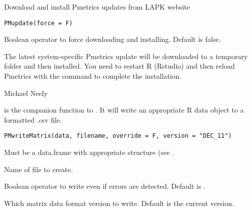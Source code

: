 \documentclass[a4paper]{book}
\begin{document}
%
\begin{Description}\relax
Download and install Pmetrics updates from LAPK website
\end{Description}
%
\begin{Usage}
\begin{verbatim}
PMupdate(force = F)
\end{verbatim}
\end{Usage}
%
\begin{Arguments}
\begin{ldescription}
\item[\code{force}] Boolean operator to force downloading and installing.  Default is false.
\end{ldescription}
\end{Arguments}
%
\begin{Value}
The latest system-specific Pmetrics update will be downloaded to a temporary
folder and then installed.  You need to restart R (Rstudio) and then reload Pmetrics with
the  command to complete the installation.
\end{Value}
%
\begin{Author}\relax
Michael Neely
\end{Author}
%
\begin{Description}\relax
{} is the companion function to .
It will write an appropriate R data object to a formatted .csv file.
\end{Description}
%
\begin{Usage}
\begin{verbatim}
PMwriteMatrix(data, filename, override = F, version = "DEC_11")
\end{verbatim}
\end{Usage}
%
\begin{Arguments}
\begin{ldescription}
\item[\code{data}] Must be a data.frame with appropriate structure (see .

\item[\code{filename}] Name of file to create.

\item[\code{override}] Boolean operator to write even if errors are detected.  Default is .

\item[\code{version}] Which matrix data format version to write.  Default is the current version.
\end{ldescription}
\end{Arguments}
\end{document}
